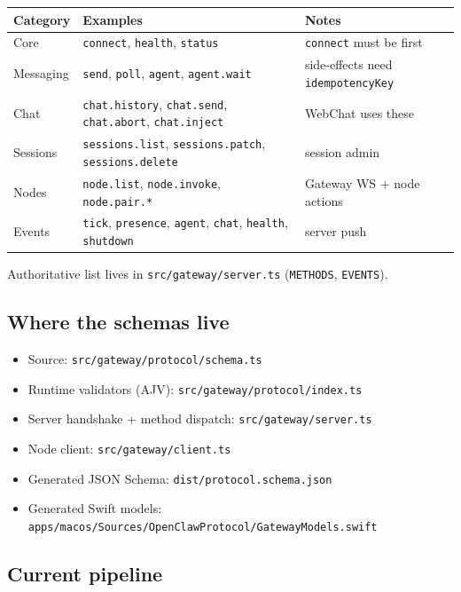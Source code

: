 \begin{table}[h]
\centering
\small
\begin{tabular}{|l|l|l|}
\hline
Category & Examples & Notes \\
\hline
Core & \texttt{connect}, \texttt{health}, \texttt{status} & \texttt{connect} must be first \\
\hline
Messaging & \texttt{send}, \texttt{poll}, \texttt{agent}, \texttt{agent.wait} & side-effects need \texttt{idempotencyKey} \\
\hline
Chat & \texttt{chat.history}, \texttt{chat.send}, \texttt{chat.abort}, \texttt{chat.inject} & WebChat uses these \\
\hline
Sessions & \texttt{sessions.list}, \texttt{sessions.patch}, \texttt{sessions.delete} & session admin \\
\hline
Nodes & \texttt{node.list}, \texttt{node.invoke}, \texttt{node.pair.*} & Gateway WS + node actions \\
\hline
Events & \texttt{tick}, \texttt{presence}, \texttt{agent}, \texttt{chat}, \texttt{health}, \texttt{shutdown} & server push \\
\hline
\end{tabular}
\end{table}



Authoritative list lives in \texttt{src/gateway/server.ts} (\texttt{METHODS}, \texttt{EVENTS}).

\subsection{Where the schemas live}


\begin{itemize}
  \item Source: \texttt{src/gateway/protocol/schema.ts}
  \item Runtime validators (AJV): \texttt{src/gateway/protocol/index.ts}
  \item Server handshake + method dispatch: \texttt{src/gateway/server.ts}
  \item Node client: \texttt{src/gateway/client.ts}
  \item Generated JSON Schema: \texttt{dist/protocol.schema.json}
  \item Generated Swift models: \texttt{apps/macos/Sources/OpenClawProtocol/GatewayModels.swift}
\end{itemize}


\subsection{Current pipeline}


